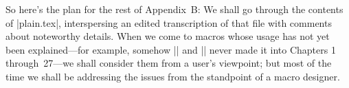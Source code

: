 {So here's the plan for the rest of Appendix~B\null: We shall go through
the contents of |plain.tex|, interspersing an edited transcription of
that file with comments about noteworthy details. When we come to
macros whose usage has not yet been explained---for example, somehow
|\vglue| and |\beginsection| never made it into Chapters 1 through~27---we
shall consider them from a user's viewpoint; but most of the time we shall
be addressing the issues from the standpoint of a macro designer.

}
